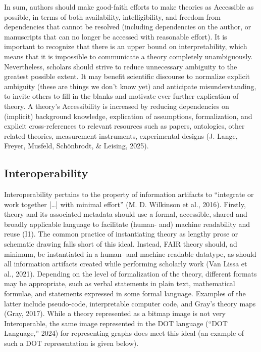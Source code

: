 \documentclass[
  man, noextraspace,floatsintext]{apa6}
\begin{document}
In sum, authors should make good-faith efforts to make theories as Accessible as possible, in terms of both availability, intelligibility, and freedom from dependencies that cannot be resolved (including dependencies on the author, or manuscripts that can no longer be accessed with reasonable effort).
It is important to recognize that there is an upper bound on interpretability, which means that it is impossible to communicate a theory completely unambiguously.
Nevertheless, scholars should strive to reduce unnecessary ambiguity to the greatest possible extent.
It may benefit scientific discourse to normalize explicit ambiguity (these are things we don't know yet) and anticipate misunderstanding,
to invite others to fill in the blanks and motivate ever further explication of theory.
A theory's Accessibility is increased by
reducing dependencies on (implicit) background knowledge,
explication of assumptions,
formalization,
and explicit cross-references to relevant resources such as papers, ontologies, other related theories, measurement instruments, experimental designs (J. Lange, Freyer, Musfeld, Schönbrodt, \& Leising, 2025).

\subsection{Interoperability}\label{interoperability}

Interoperability pertains to the property of information artifacts to ``integrate or work together {[}\ldots{]} with minimal effort'' (M. D. Wilkinson et al., 2016).
Firstly, theory and its associated metadata should use a formal, accessible, shared and broadly applicable language to facilitate (human- and) machine readability and reuse (I1).
The common practice of instantiating theory as lengthy prose or schematic drawing falls short of this ideal.
Instead, FAIR theory should, ad minimum,
be instantiated in a human- and machine-readable datatype,
as should all information artifacts created while performing scholarly work (Van Lissa et al., 2021).
Depending on the level of formalization of the theory,
different formats may be appropriate,
such as verbal statements in plain text,
mathematical formulae,
and statements expressed in some formal language.
Examples of the latter include pseudo-code,
interpretable computer code,
and Gray's theory maps (Gray, 2017).
While a theory represented as a bitmap image is not very Interoperable,
the same image represented in the DOT language ({``{DOT Language},''} 2024)
for representing graphs does meet this ideal (an example of such a DOT representation is given below).
\end{document}
